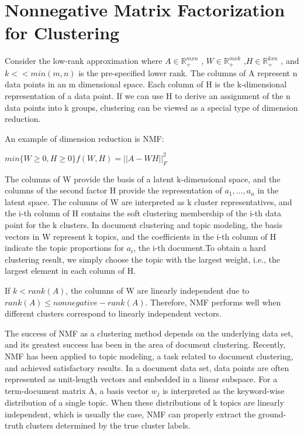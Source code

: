 \documentclass[11pt, oneside]{article}   	%
\begin{document}
\section{Nonnegative Matrix Factorization for Clustering}

Consider the low-rank approximation where $A \in \mathbb{R}^{mxn}_+$ , $W \in \mathbb{R}^{mxk}_+$ ,$H \in \mathbb{R}^{kxn}_+$ , and $k << min(m,n)$ is the pre-specified lower rank. The columns of A represent n data points in an m dimensional space. Each column of H is the k-dimensional representation of a data point. If we can use H to derive an assignment of the n data points into k groups, clustering can be viewed as a special type of dimension reduction.


An example of dimension reduction is NMF:

 \begin{center}
 $min\{W\ge0,H\ge0\}f(W,H)=||A-WH||^2_F$
 \end{center}

The columns of W provide the basis of a latent k-dimensional space, and the columns of the second factor H provide the representation of $a_1,...,a_n$ in the latent space. The columns of W are interpreted as k cluster representatives, and the i-th column of H contains the soft clustering membership of the i-th data point for the k clusters. In document clustering and topic modeling, the basis vectors in W represent k topics, and the coefficients in the i-th column of H indicate the topic proportions for $a_i$, the i-th document.To obtain a hard clustering result, we simply choose the topic with the largest weight, i.e., the largest element in each column of H.


If $k < rank(A)$, the columns of W are linearly independent due to $rank(A) \le nonnegative-rank(A)$. Therefore, NMF performs well when different clusters correspond to linearly independent vectors.

The success of NMF as a clustering method depends on the underlying data set, and its greatest success has been in the area of document clustering. Recently, NMF has been applied to topic modeling, a task related to document clustering, and achieved satisfactory results. In a document data set, data points are often represented as unit-length vectors and embedded in a linear subspace. For a term-document matrix A, a basis vector $w_j$ is interpreted as the keyword-wise distribution of a single topic. When these distributions of k topics are linearly independent, which is usually the case, NMF can properly extract the ground-truth clusters determined by the true cluster labels.
\end{document}
